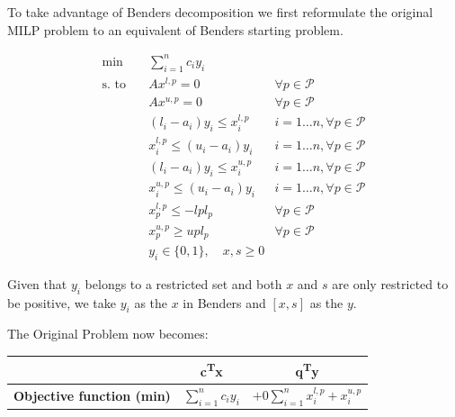 \documentclass[11pt,a4paper]{article}
\begin{document}
To take advantage of Benders decomposition we first reformulate the original MILP
problem to an equivalent of Benders starting problem.

\begin{align*}
\min \quad & \sum_{i=1}^{n} c_i y_i \\
\text{s. to} \quad & Ax^{l,p} = 0 & \forall p \in \mathcal{P} \\
& Ax^{u,p} = 0 & \forall p \in \mathcal{P} \\
& (l_i - a_i)y_i \leq x_i^{l,p} & i=1 \dots n, \forall p \in \mathcal{P} \\
& x_i^{l,p} \leq (u_i - a_i)y_i & i=1 \dots n, \forall p \in \mathcal{P} \\
& (l_i - a_i)y_i \leq x_i^{u,p} & i=1 \dots n, \forall p \in \mathcal{P} \\
& x_i^{u,p} \leq (u_i - a_i)y_i & i=1 \dots n, \forall p \in \mathcal{P} \\
& x_p^{l,p} \leq -lpl_p & \forall p \in \mathcal{P} \\
& x_p^{u,p} \geq upl_p & \forall p \in \mathcal{P} \\
& y_i \in \{0, 1\}, \quad x, s \geq 0
\end{align*}

Given that $y_i$ belongs to a restricted set and both $x$ and $s$ are only restricted to be positive,
we take $y_i$ as the $x$ in Benders and $[x,s]$ as the $y$.

The Original Problem now becomes:
\begin{table}[h]
    \centering
    \begin{tabular}{| l | c c |}
        \toprule
        & \textbf{c\textsuperscript{T}x} & \textbf{q\textsuperscript{T}y} \\
        \hline
        \textbf{Objective function (min)} & $\sum_{i=1}^{n} c_i y_i$ & $+ 0 \sum_{i=1}^{n}x_{i}^{l,p}+x_{i}^{u, p}$ \\
        \bottomrule
    \end{tabular}
\end{table}
\end{document}
